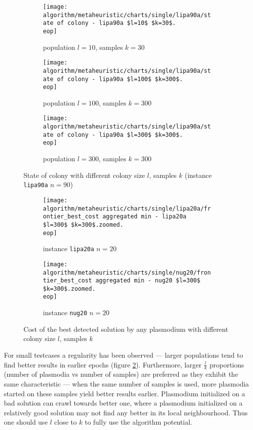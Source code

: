\begin{figure}
  \centering

  \begin{subfigure}{\textwidth}
    \texttt{[image: algorithm/metaheuristic/charts/single/lipa90a/state of colony - lipa90a \$l=10\$ \$k=30\$.\\eop]}
    \caption{population $l=10$, samples $k=30$}
  \end{subfigure}
  \par\bigskip
  \begin{subfigure}{\textwidth}
    \texttt{[image: algorithm/metaheuristic/charts/single/lipa90a/state of colony - lipa90a \$l=100\$ \$k=300\$.\\eop]}
    \caption{population $l=100$, samples $k=300$}
  \end{subfigure}
  \par\bigskip
  \begin{subfigure}{\textwidth}
    \texttt{[image: algorithm/metaheuristic/charts/single/lipa90a/state of colony - lipa90a \$l=300\$ \$k=300\$.\\eop]}
    \caption{population $l=300$, samples $k=300$}
  \end{subfigure}

  \caption{State of colony with different colony size $l$, samples $k$ (instance \texttt{lipa90a} $n=90$)}
  \label{figure:am_state_of_colony}
\end{figure}


\begin{figure}
  \centering

  \begin{subfigure}{\textwidth}
    \texttt{[image: algorithm/metaheuristic/charts/single/lipa20a/frontier\_best\_cost aggregated min - lipa20a \$l=300\$ \$k=300\$.zoomed.\\eop]}
    \caption{instance \texttt{lipa20a} $n=20$}
  \end{subfigure}
  \par\bigskip
  \begin{subfigure}{\textwidth}
    \texttt{[image: algorithm/metaheuristic/charts/single/nug20/frontier\_best\_cost aggregated min - nug20 \$l=300\$ \$k=300\$.zoomed.\\eop]}
    \caption{instance \texttt{nug20} $n=20$}
  \end{subfigure}
  
  \caption{Cost of the best detected solution by any plasmodium with different colony size $l$, samples $k$}
  \label{figure:am_best_cost}
\end{figure}

For small testcases a regularity has been observed --- larger populations tend to find better results in earlier epochs (figure \ref{figure:am_best_cost}). Furthermore, larger $\frac{l}{k}$ proportions (number of plasmodia vs number of samples) are preferred as they exhibit the same characteristic --- when the same number of samples is used, more plasmodia started on these samples yield better results earlier. Plasmodium initialized on a bad solution can crawl towards better one, where a plasmodium initialized on a relatively good solution may not find any better in its local neighbourhood. Thus one should use $l$ close to $k$ to fully use the algorithm potential. 



